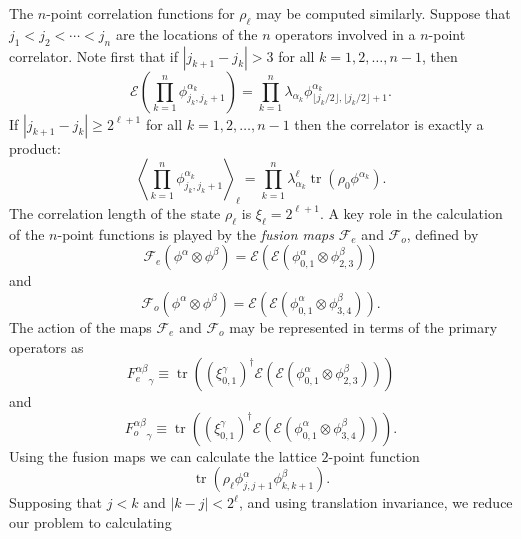 \documentclass[prl,twocolumn,lengthcheck,superscriptaddress]{revtex4-1}
\newcommand{\tr}{\operatorname{tr}}
\theoremstyle{definition}
\theoremstyle{remark}
\begin{document}
The $n$-point correlation functions for $\rho_\ell$ may be computed similarly. Suppose that $j_1 < j_2 < \cdots < j_n$ are the locations of the $n$ operators involved in a $n$-point correlator. Note first that if $|j_{k+1}-j_{k}| > 3$ for all $k = 1, 2, \ldots, n-1$, then
\begin{equation}
	\mathcal{E}\left(\prod_{k=1}^n \phi_{j_k,j_{k}+1}^{\alpha_k}\right) = \prod_{k=1}^n \lambda_{\alpha_k} \phi_{\lfloor j_k/2 \rfloor,\lfloor j_k/2 \rfloor+1}^{\alpha_k}.
\end{equation}
If $|j_{k+1}-j_{k}| \ge 2^{\ell+1}$ for all $k = 1, 2, \ldots, n-1$ then the correlator is exactly a product:
\begin{equation}
	\left\langle \prod_{k=1}^n \phi_{j_k,j_{k}+1}^{\alpha_k} \right\rangle_{\ell}  = \prod_{k=1}^n \lambda_{\alpha_k}^{\ell} \tr(\rho_0  \phi^{\alpha_k}).
\end{equation}
The correlation length of the state $\rho_\ell$ is $\xi_\ell = 2^{\ell+1}$.
A key role in the calculation of the $n$-point functions is played by the \emph{fusion maps} $\mathcal{F}_e$ and $\mathcal{F}_o$, defined by 
\begin{equation}
	\mathcal{F}_e(\phi^\alpha\otimes \phi^{\beta}) =  \mathcal{E}\left(\mathcal{E}\left(\phi^\alpha_{0,1}\otimes \phi^{\beta}_{2,3}\right)\right)
\end{equation}
and
\begin{equation}
	\mathcal{F}_o(\phi^\alpha\otimes \phi^{\beta}) =  \mathcal{E}\left(\mathcal{E}\left(\phi^\alpha_{0,1}\otimes \phi^{\beta}_{3,4}\right)\right).
\end{equation}
The action of the maps $\mathcal{F}_e$ and $\mathcal{F}_o$ may be represented in terms of the primary operators as
\begin{equation}
	{F_e^{\alpha\beta}}_\gamma \equiv \tr\left ((\xi_{0,1}^\gamma)^\dag\mathcal{E}\left(\mathcal{E}\left(\phi^\alpha_{0,1}\otimes \phi^{\beta}_{2,3}\right)\right)\right)
\end{equation}
and
\begin{equation}
	{F_o^{\alpha\beta}}_\gamma \equiv \tr\left ((\xi_{0,1}^\gamma)^\dag\mathcal{E}\left(\mathcal{E}\left(\phi^\alpha_{0,1}\otimes \phi^{\beta}_{3,4}\right)\right)\right).
\end{equation}
Using the fusion maps we can calculate the lattice $2$-point function
\begin{equation}
	\tr(\rho_{\ell}\phi_{j,j+1}^{\alpha}\phi_{k,k+1}^{\beta}).
\end{equation}
Supposing that $j<k$ and $|k-j| < 2^\ell$, and using translation invariance, we reduce our problem to calculating
\end{document}
